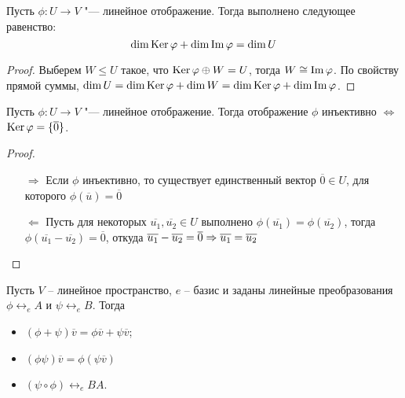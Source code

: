     \begin{theorem}
    	Пусть $\phi: U \to V$ "--- линейное отображение. Тогда выполнено следующее равенство:
    	\[\dim{\operatorname{Ker}{\ensuremath{\varphi}}} + \dim{\operatorname{Im}{\ensuremath{\varphi}}} = \dim{U}\]
    \end{theorem}
    
    \begin{proof}
    	Выберем $W \le U$ такое, что $\operatorname{Ker}{\varphi} \oplus W = U$, тогда $W \cong \operatorname{Im}{\varphi}$. По свойству прямой суммы, $\dim{U} = \dim{\ke{\phi}} \hm{+} \dim{W} = \dim{\ke{\phi}} + \dim{\im{\phi}}$.
    \end{proof}
    
    \begin{proposition}
    	Пусть $\phi: U \rightarrow V$ "--- линейное отображение. Тогда отображение $\phi$ инъективно $\Leftrightarrow$ $\operatorname{Ker}{\varphi} = \{\overline{0}\}$.
    \end{proposition}
    
    \begin{proof}~
    	\begin{itemize}
    		\item[$\Rightarrow$] Если $\phi$ инъективно, то существует единственный вектор $\overline{0} \in U$, для которого $\phi(\overline{u}) = \overline{0}$
    		
    		\item[$\Leftarrow$] Пусть для некоторых $\overline{u_1}, \overline{u_2} \in U$ выполнено $\phi(\overline{u_1}) = \phi(\overline{u_2})$, тогда $\phi(\overline{u_1} - \overline{u_2}) = \overline{0}$, откуда $\overline{u_1} - \overline{u_2} = \overline 0 \Rightarrow \overline{u_1} = \overline{u_2}$\qedhere
    	\end{itemize}
    \end{proof}
    
    \begin{theorem}
        Пусть $V$ -- линейное пространство, $e$ -- базис и заданы линейные преобразования $\phi \leftrightarrow_{e} A$ и $\psi \leftrightarrow_{e} B$. Тогда
        \begin{itemize}
            \item $(\phi + \psi)\overline{v} = \phi\overline{v} + \psi\overline{v}$; 
            \item $(\phi \psi)\overline{v} = \phi(\psi\overline{v})$
            \item $(\psi \circ \phi) \leftrightarrow_{e} BA$.
        \end{itemize}
    \end{theorem}
    
